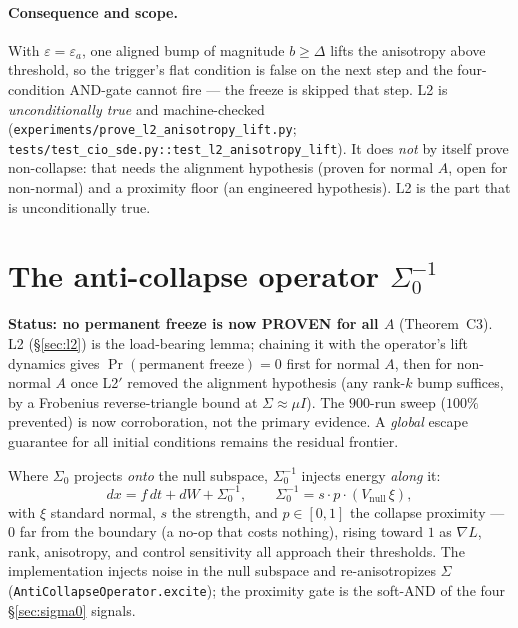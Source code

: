 \documentclass[11pt]{article}
\theoremstyle{definition}
\newcommand{\Szero}{\Sigma_0}
\begin{document}
\paragraph{Consequence and scope.} With $\varepsilon=\varepsilon_a$, one aligned bump of
magnitude $b\ge\Delta$ lifts the anisotropy above threshold, so the trigger's flat
condition is false on the next step and the four-condition AND-gate cannot fire --- the
freeze is skipped that step. L2 is \emph{unconditionally true} and machine-checked
(\texttt{experiments/\allowbreak prove\_l2\_anisotropy\_lift.py};
\texttt{tests/\allowbreak test\_cio\_sde.py::\allowbreak test\_l2\_anisotropy\_lift}). It does \emph{not} by itself
prove non-collapse: that needs the alignment hypothesis (proven for normal $A$, open for
non-normal) and a proximity floor (an engineered hypothesis). L2 is the part that is
unconditionally true.

\section{The anti-collapse operator $\Sigma_0^{-1}$}
\label{sec:anti}
\begin{caveatbox}
\textbf{Status: no permanent freeze is now PROVEN for all $A$} (Theorem~C3). L2
(\S\ref{sec:l2}) is the load-bearing lemma; chaining it with the operator's lift dynamics
gives $\Pr(\text{permanent freeze})=0$ first for normal $A$, then for non-normal $A$ once
L2$'$ removed the alignment hypothesis (any rank-$k$ bump suffices, by a Frobenius
reverse-triangle bound at $\Sigma\approx\mu I$). The $900$-run sweep ($100\%$ prevented) is
now corroboration, not the primary evidence. A \emph{global} escape guarantee for all
initial conditions remains the residual frontier.
\end{caveatbox}
Where $\Szero$ projects \emph{onto} the null subspace, $\Sigma_0^{-1}$ injects energy
\emph{along} it:
\begin{equation}
dx = f\,dt + dW + \Sigma_0^{-1}, \qquad
\Sigma_0^{-1} = s\cdot p \cdot (V_{\mathrm{null}}\,\xi),
\end{equation}
with $\xi$ standard normal, $s$ the strength, and $p\in[0,1]$ the collapse proximity ---
$0$ far from the boundary (a no-op that costs nothing), rising toward $1$ as $\nabla L$,
rank, anisotropy, and control sensitivity all approach their thresholds. The implementation
injects noise in the null subspace and re-anisotropizes $\Sigma$
(\texttt{AntiCollapseOperator.excite}); the proximity gate is the soft-AND of the four
\S\ref{sec:sigma0} signals.
\end{document}
